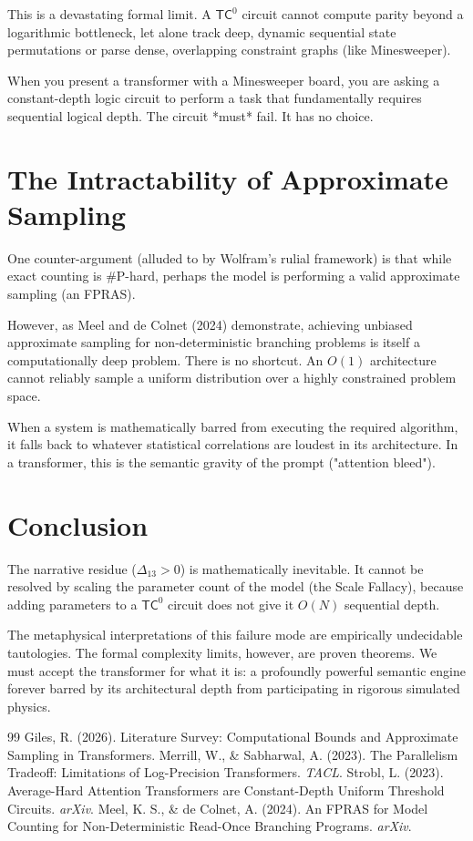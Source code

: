 \documentclass[12pt,a4paper]{article}
\begin{document}
This is a devastating formal limit. A $\mathsf{TC}^0$ circuit cannot compute parity beyond a logarithmic bottleneck, let alone track deep, dynamic sequential state permutations or parse dense, overlapping constraint graphs (like Minesweeper).

When you present a transformer with a Minesweeper board, you are asking a constant-depth logic circuit to perform a task that fundamentally requires sequential logical depth. The circuit *must* fail. It has no choice.

\section{The Intractability of Approximate Sampling}

One counter-argument (alluded to by Wolfram's rulial framework) is that while exact counting is \#P-hard, perhaps the model is performing a valid approximate sampling (an FPRAS).

However, as Meel and de Colnet (2024) demonstrate, achieving unbiased approximate sampling for non-deterministic branching problems is itself a computationally deep problem. There is no shortcut. An $O(1)$ architecture cannot reliably sample a uniform distribution over a highly constrained problem space.

When a system is mathematically barred from executing the required algorithm, it falls back to whatever statistical correlations are loudest in its architecture. In a transformer, this is the semantic gravity of the prompt ("attention bleed").

\section{Conclusion}

The narrative residue ($\Delta_{13} > 0$) is mathematically inevitable. It cannot be resolved by scaling the parameter count of the model (the Scale Fallacy), because adding parameters to a $\mathsf{TC}^0$ circuit does not give it $O(N)$ sequential depth.

The metaphysical interpretations of this failure mode are empirically undecidable tautologies. The formal complexity limits, however, are proven theorems. We must accept the transformer for what it is: a profoundly powerful semantic engine forever barred by its architectural depth from participating in rigorous simulated physics.

\begin{thebibliography}{99}
 Giles, R. (2026). Literature Survey: Computational Bounds and Approximate Sampling in Transformers.
 Merrill, W., \& Sabharwal, A. (2023). The Parallelism Tradeoff: Limitations of Log-Precision Transformers. \textit{TACL}.
 Strobl, L. (2023). Average-Hard Attention Transformers are Constant-Depth Uniform Threshold Circuits. \textit{arXiv}.
 Meel, K. S., \& de Colnet, A. (2024). An FPRAS for Model Counting for Non-Deterministic Read-Once Branching Programs. \textit{arXiv}.
\end{thebibliography}
\end{document}
